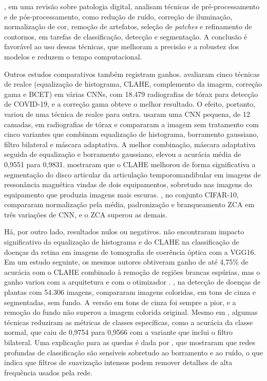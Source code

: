 , em uma revisão sobre patologia digital, analisam técnicas de pré-processamento e de pós-processamento, como redução de ruído, correção de iluminação, normalização de cor, remoção de artefatos, seleção de \textit{patches} e refinamento de contornos, em tarefas de classificação, detecção e segmentação. A conclusão é favorável ao uso dessas técnicas, que melhoram a precisão e a robustez dos modelos e reduzem o tempo computacional.

Outros estudos comparativos também registram ganhos.  avaliaram cinco técnicas de realce (equalização de histograma, CLAHE, complemento da imagem, correção gama e BCET) em várias CNNs, com 18.479 radiografias de tórax para detecção de COVID-19, e a correção gama obteve o melhor resultado. O efeito, portanto, variou de uma técnica de realce para outra.  usaram uma CNN pequena, de 12 camadas, em radiografias de tórax e compararam a imagem sem tratamento com cinco variantes que combinam equalização de histograma, borramento gaussiano, filtro bilateral e máscara adaptativa. A melhor combinação, máscara adaptativa seguida de equalização e borramento gaussiano, elevou a acurácia média de 0,9551 para 0,9831.  mostraram que o CLAHE melhorou de forma significativa a segmentação do disco articular da articulação temporomandibular em imagens de ressonância magnética vindas de dois equipamentos, sobretudo nas imagens do equipamento que produzia imagens mais escuras. , no conjunto CIFAR-10, compararam normalização pela média, padronização e branqueamento ZCA em três variações de CNN, e o ZCA superou as demais.

Há, por outro lado, resultados nulos ou negativos.  não encontraram impacto significativo da equalização de histograma e do CLAHE na classificação de doenças da retina em imagens de tomografia de coerência óptica com a VGG16. Em um estudo seguinte, os mesmos autores obtiveram ganho de até 4,75\% de acurácia com o CLAHE combinado à remoção de regiões brancas espúrias, mas o ganho variou com a arquitetura e com o otimizador \cite{marciniak2024impact}. , na detecção de doenças de plantas com 54.306 imagens, compararam imagens coloridas, em tons de cinza e segmentadas, sem fundo. A versão em tons de cinza foi sempre a pior, e a remoção do fundo não superou a imagem colorida original. Mesmo em , algumas técnicas reduziram as métricas de classes específicas, como a acurácia da classe normal, que caiu de 0,9754 para 0,9566 com a variante que inclui o filtro bilateral. Uma explicação para as quedas é dada por , que mostraram que redes profundas de classificação são sensíveis sobretudo ao borramento e ao ruído, o que indica que filtros de suavização intensos podem remover detalhes de alta frequência usados pela rede.

